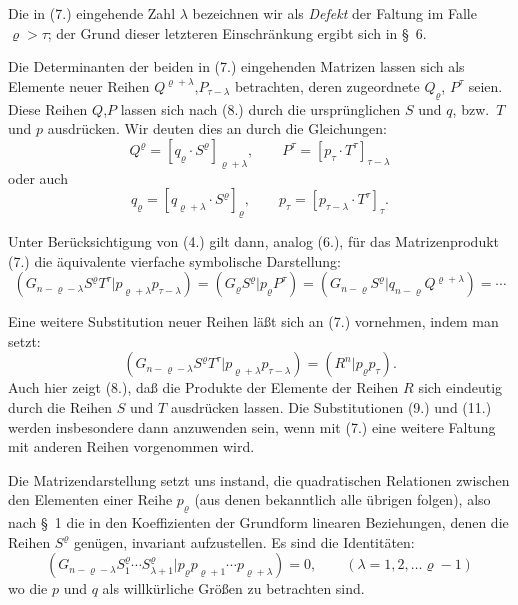 \documentclass[12pt,a4paper]{article}
\begin{document}
Die in (7.) eingehende Zahl $\lambda$ bezeichnen wir als \textit{Defekt} der Faltung im Falle $\varrho > \tau$; der Grund dieser letzteren Einschränkung ergibt sich in \S\ 6.

Die Determinanten der beiden in (7.) eingehenden Matrizen lassen sich als Elemente neuer Reihen $Q^{\varrho+\lambda}$,$P_{\tau-\lambda}$ betrachten, deren zugeordnete $Q_{\varrho}$, $P^{\tau}$ seien. Diese Reihen $Q$,$P$ lassen sich nach (8.) durch die ursprünglichen $S$ und $q$, bzw.\ $T$ und $p$ ausdrücken. Wir deuten dies an durch die Gleichungen:
\begin{equation}\tag{9}
Q^{\varrho} = [q_{\varrho} \cdot S^{\varrho}]_{\varrho+\lambda}, \qquad P^{\tau} = [p_{\tau} \cdot T^{\tau}]_{\tau-\lambda}
\end{equation}
oder auch
\begin{equation*}
q_{\varrho} = [q_{\varrho+\lambda} \cdot S^{\varrho}]_{\varrho}, \qquad p_{\tau} = [p_{\tau-\lambda} \cdot T^{\tau}]_{\tau}.
\end{equation*}

Unter Berücksichtigung von (4.) gilt dann, analog (6.), für das Matrizenprodukt (7.) die äquivalente vierfache symbolische Darstellung:
\begin{equation}\tag{10}
(G_{n-\varrho-\lambda} S^{\varrho} T^{\tau} | p_{\varrho+\lambda} p_{\tau-\lambda}) = (G_{\varrho} S^{\varrho} | p_{\varrho} P^{\tau}) = (G_{n-\varrho} S^{\varrho} | q_{n-\varrho} Q^{\varrho+\lambda}) = \cdots
\end{equation}

Eine weitere Substitution neuer Reihen läßt sich an (7.) vornehmen, indem man setzt:
\begin{equation}\tag{11}
(G_{n-\varrho-\lambda} S^{\varrho} T^{\tau} | p_{\varrho+\lambda} p_{\tau-\lambda}) = (R^{n} | p_{\varrho} p_{\tau}).
\end{equation}
Auch hier zeigt (8.), daß die Produkte der Elemente der Reihen $R$ sich eindeutig durch die Reihen $S$ und $T$ ausdrücken lassen. Die Substitutionen (9.) und (11.) werden insbesondere dann anzuwenden sein, wenn mit (7.) eine weitere Faltung mit anderen Reihen vorgenommen wird.

Die Matrizendarstellung setzt uns instand, die quadratischen Relationen zwischen den Elementen einer Reihe $p_{\varrho}$ (aus denen bekanntlich alle übrigen folgen), also nach \S\ 1 die in den Koeffizienten der Grundform linearen Beziehungen, denen die Reihen $S^{\varrho}$ genügen, invariant aufzustellen. Es sind die Identitäten:
\begin{equation}\tag{12}
(G_{n-\varrho-\lambda} S^{\varrho}_{1} \cdots S^{\varrho}_{\lambda+1} | p_{\varrho} p_{\varrho+1} \cdots p_{\varrho+\lambda}) = 0, \qquad (\lambda = 1, 2, \ldots \varrho-1)
\end{equation}
wo die $p$ und $q$ als willkürliche Größen zu betrachten sind.
\end{document}
